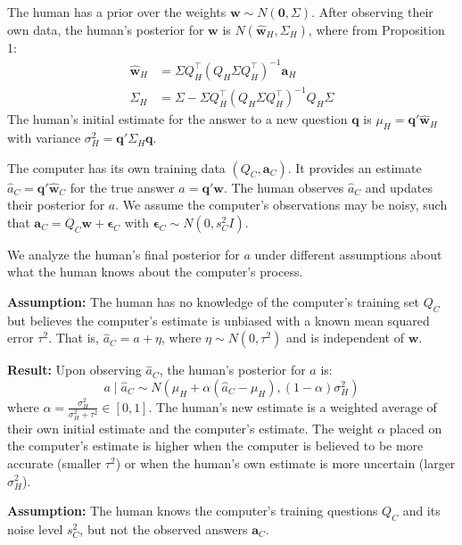 \documentclass[
  11pt,
  letterpaper,
  DIV=11,
  numbers=noendperiod,
  oneside]{scrartcl}
\providecommand{\tightlist}{%
  \setlength{\itemsep}{0pt}\setlength{\parskip}{0pt}}\usepackage{longtable,booktabs,array}
\newcommand{\bm}[1]{\boldsymbol{#1}}
\begin{document}
The human has a prior over the weights
\(\bm{w} \sim N(\bm{0}, \Sigma)\). After observing their own data, the
human's posterior for \(\bm{w}\) is \(N(\hat{\bm{w}}_H, \Sigma_H)\),
where from Proposition 1: \[\begin{aligned}
      \hat{\bm{w}}_H &= \Sigma Q_H^{\top}(Q_H\Sigma Q_H^{\top})^{-1}\bm{a}_H \\
      \Sigma_H &= \Sigma - \Sigma Q_H^{\top}(Q_H\Sigma Q_H^{\top})^{-1}Q_H\Sigma
   \end{aligned}\] The human's initial estimate for the answer to a new
question \(\bm{q}\) is \(\mu_H = \bm{q}'\hat{\bm{w}}_H\) with variance
\(\sigma_H^2 = \bm{q}'\Sigma_H \bm{q}\).

The computer has its own training data \((Q_C, \bm{a}_C)\). It provides
an estimate \(\hat{a}_C = \bm{q}'\hat{\bm{w}}_C\) for the true answer
\(a = \bm{q}'\bm{w}\). The human observes \(\hat{a}_C\) and updates
their posterior for \(a\). We assume the computer's observations may be
noisy, such that \(\bm{a}_C = Q_C\bm{w} + \bm{\epsilon}_C\) with
\(\bm{\epsilon}_C \sim N(0, s_C^2 I)\).

We analyze the human's final posterior for \(a\) under different
assumptions about what the human knows about the computer's process.

\begin{description}
\tightlist
\item[Proposition 4.1 (Minimal knowledge: ``Pure Kalman filter'').]
\textbf{Assumption:} The human has no knowledge of the computer's
training set \(Q_C\) but believes the computer's estimate is unbiased
with a known mean squared error \(\tau^2\). That is,
\(\hat{a}_C = a + \eta\), where \(\eta \sim N(0, \tau^2)\) and is
independent of \(\bm{w}\).
\end{description}

\textbf{Result:} Upon observing \(\hat{a}_C\), the human's posterior for
\(a\) is:
\[ a \mid \hat{a}_C \sim N\left( \mu_H + \alpha(\hat{a}_C - \mu_H), (1-\alpha)\sigma_H^2 \right) \]
where \(\alpha = \frac{\sigma_H^2}{\sigma_H^2 + \tau^2} \in [0,1]\). The
human's new estimate is a weighted average of their own initial estimate
and the computer's estimate. The weight \(\alpha\) placed on the
computer's estimate is higher when the computer is believed to be more
accurate (smaller \(\tau^2\)) or when the human's own estimate is more
uncertain (larger \(\sigma_H^2\)).

\begin{description}
\tightlist
\item[Proposition 4.2 (Knowledge of computer's questions).]
\textbf{Assumption:} The human knows the computer's training questions
\(Q_C\) and its noise level \(s_C^2\), but not the observed answers
\(\bm{a}_C\).
\end{description}
\end{document}
